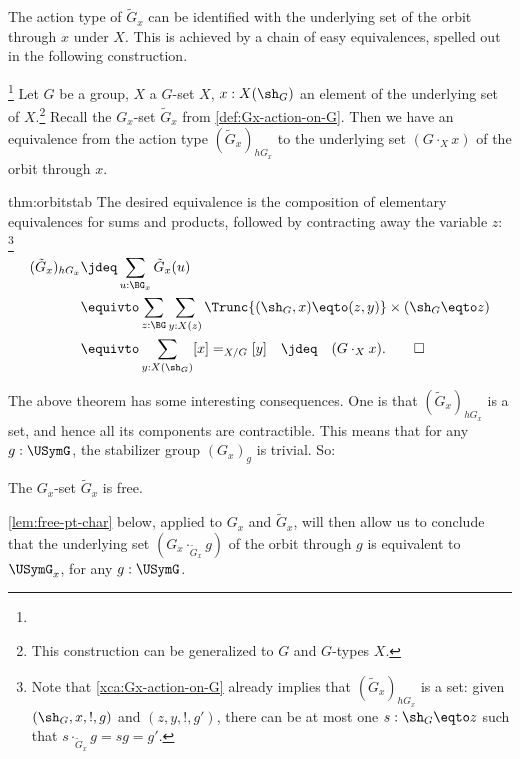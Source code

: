 The action type of $\tilde G_x$ can be identified with the 
underlying set of the orbit through $x$ under $X$. This is 
achieved by a chain of easy equivalences, spelled
out in the following construction.

\begin{construction}
\footnote{}
  \label{thm:orbitstab} Let $G$ be a group, $X$ a $G$-set $X$,
  $x : X(\sh_G)$ an element of the underlying set of $X$.\footnote{%
  This construction can be generalized to \inftygps $G$ and $G$-types $X$.}
  Recall the $G_x$-set $\tilde G_x$ from \cref{def:Gx-action-on-G}.
  Then we have an equivalence from the action type $(\tilde G_x)_{hG_x}$
  to the underlying set $(G\cdot_X x)$ of the orbit through $x$.
\end{construction}
\begin{implementation}{thm:orbitstab}
  The desired equivalence is the composition of elementary equivalences
  for sums and products, followed by contracting away the variable $z$:
\footnote{\label{ft:action-type-tildeGx-set} 
Note that \cref{xca:Gx-action-on-G} already
implies that $(\tilde G_x)_{hG_x}$ is a set:
given $(\sh_G,x,!,g)$ and $(z,y,!,g')$, there can be at most
one $s : \sh_G \eqto z$ such that $s\cdot_{\tilde G_x} g = sg = g'$. 
}
  \begin{align*}
    (\tilde G_x)_{hG_x}
    &\jdeq \sum_{u : \BG_x}\tilde G_x(u) \\
    &\equivto \sum_{z:\BG}\sum_{y:X(z)}
    \Trunc{(\sh_G,x) \eqto (z,y)}\times (\sh_G \eqto z) \\
    &\equivto \sum_{y:X(\sh_G)}[x] =_{X/G} [y]\quad\jdeq\quad(G\cdot_X x).\qedhere
  \end{align*}
\end{implementation}

The above theorem has some interesting consequences.
One is that $(\tilde G_x)_{hG_x}$ is a set, 
and hence all its components are contractible.
This means that for any $g:\USymG$, the stabilizer group $(G_x)_g$
is trivial. So:

\begin{corollary}\label{cor:action-subgrp-free}
 The $G_x$-set $\tilde G_x$ is free.
\end{corollary}

\cref{lem:free-pt-char} below, applied to $G_x$ and $\tilde G_x$,
will then allow us to conclude that the underlying set 
$(G_x \cdot_{\tilde G_x} g)$ of the orbit through $g$ is equivalent to 
$\USymG_x$, for any $g:\USymG$.

